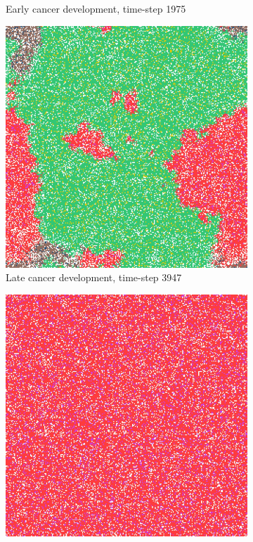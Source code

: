 \documentclass[\main/thesis.tex]{subfiles}
\begin{document}
\begin{figure}[H]
\begin{subfigure}[t]{.45\textwidth}
      \caption{Early cancer development, time-step 1975}
      \label{fig:GeneralObservations_earlyTumour}
    \end{subfigure}
    \begin{subfigure}[t]{.45\textwidth}
      \centering
      \includegraphics[width=\textwidth]{images/2_GeneralObservations/Fig5/5_late_tumour_3947.jpeg}
      \caption{Late cancer development, time-step 3947}
      \label{fig:GeneralObservations_lateTumour}
    \end{subfigure}
    \begin{subfigure}[t]{.45\textwidth}
      \centering
      \includegraphics[width=\textwidth]{images/2_GeneralObservations/Fig5/6_final.jpeg}

\end{subfigure}
\end{figure}
\end{document}
